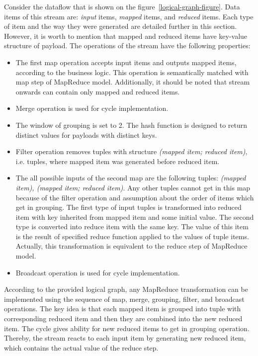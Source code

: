 Consider the dataflow that is shown on the figure~\ref {logical-graph-figure}. Data items of this stream are: {\it input} items, {\it mapped} items, and {\it reduced} items. Each type of item and the way they were generated are detailed further in this section. However, it is worth to mention that mapped and reduced items have key-value structure of payload. The operations of the stream have the following properties:

\begin{itemize}
\item The first map operation accepts input items and outputs mapped items, according to the business logic. This operation is semantically matched with map step of MapReduce model. Additionally, it should be noted that stream onwards can contain only mapped and reduced items.
\item Merge operation is used for cycle implementation.
\item The window of grouping is set to 2. The hash function is designed to return distinct values for payloads with distinct keys.
\item Filter operation removes tuples with structure \textit{(mapped item; reduced item)}, i.e. tuples, where mapped item was generated before reduced item.
\item The all possible inputs of the second map are the following tuples: \textit{(mapped item), (mapped item; reduced item)}. Any other tuples cannot get in this map because of the filter operation and assumption about the order of items which get in grouping. The first type of input tuples is transformed into reduced item with key inherited from mapped item and some initial value.  The second type is converted into reduce item with the same key. The value of this item is the result of specified reduce function applied to the values of tuple items. Actually, this transformation is equivalent to the reduce step of MapReduce model.
\item Broadcast operation is used for cycle implementation.
\end{itemize}

According to the provided logical graph, any MapReduce transformation can be implemented using the sequence of map, merge, grouping, filter, and broadcast operations. The key idea is that each mapped item is grouped into tuple with corresponding reduced item and then they are combined into the new reduced item. The cycle gives ability for new reduced items to get in grouping operation. Thereby, the stream reacts to each input item by generating new reduced item, which contains the actual value of the reduce step. 

